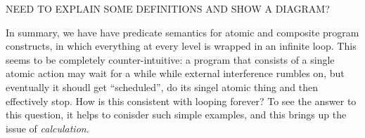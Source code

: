NEED TO EXPLAIN SOME DEFINITIONS AND SHOW A DIAGRAM?


In summary,
we have have predicate semantics for atomic and composite program
constructs,
in which everything at every level is wrapped in an infinite loop.
This seems to be completely counter-intuitive:
a program that consists of a single atomic action may wait
for a while while external interference rumbles on,
but eventually it shoudl get ``scheduled'', do its singel atomic thing
and then effectively stop.
How is this consistent with looping forever?
To see the answer to this question,
it helps to conisder such simple examples,
and this brings up the issue of \emph{calculation}.
